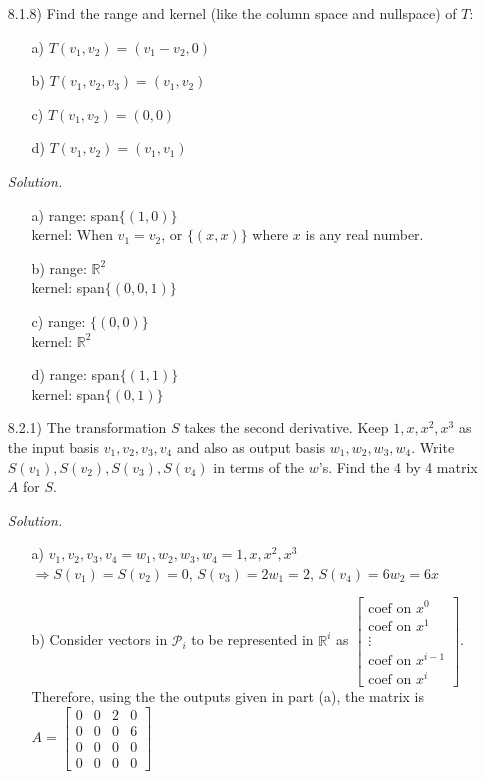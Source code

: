 \documentclass[12pt,pdftex]{article}
\begin{document}
\begin{itemize}
\item[8.1.8)] Find the range and kernel (like the column space and nullspace) of $T$:
\begin{itemize}
\item[a)] $T(v_1,v_2)=(v_1-v_2,0)$
\item[b)] $T(v_1,v_2,v_3)=(v_1,v_2)$
\item[c)] $T(v_1,v_2)=(0,0)$
\item[d)] $T(v_1,v_2)=(v_1,v_1)$
\end{itemize}

\textit{Solution.}
\begin{itemize}
\item[a)] range: span$\{(1, 0)\}$\\
			kernel: When $v_1=v_2$, or $\{(x,x)\}$ where $x$ is any real number.
\item[b)] range: $\mathbb{R}^2$\\
			kernel: span$\{(0,0,1)\}$
\item[c)] range: $\{(0,0)\}$\\
			kernel: $\mathbb{R}^2$
\item[d)] range: span$\{(1,1)\}$\\
			kernel: span$\{(0,1)\}$
\end{itemize}

\item[8.2.1)] The transformation $S$ takes the second derivative. Keep $1,x,x^2,x^3$ as the input basis 
				$v_1,v_2,v_3,v_4$ and also as output basis $w_1,w_2,w_3,w_4$. Write $S(v_1),S(v_2),S(v_3),S(v_4)$ in terms
                of the $w$'s. Find the 4 by 4 matrix $A$ for $S$.

\textit{Solution.}
\begin{itemize}
\item[a)] $v_1,v_2,v_3,v_4=w_1,w_2,w_3,w_4=1,x,x^2,x^3$\\
		$\Rightarrow S(v_1)=S(v_2)=0$, $S(v_3)=2w_1=2$, $S(v_4)=6w_2=6x$
\item[b)] Consider vectors in $\mathcal{P}_i$ to be represented in $\mathbb{R}^i$ as $\begin{bmatrix}
			\text{coef on } x^0 \\ \text{coef on } x^1 \\ \vdots \\ \text{coef on } x^{i - 1} \\ \text{coef on } x^i
			\end{bmatrix}$. Therefore, using the the outputs given in part (a), the matrix is $A=\begin{bmatrix}
			0 & 0 & 2 & 0 \\ 0 & 0 & 0 & 6 \\ 0 & 0 & 0 & 0 \\ 0 & 0 & 0 & 0
			\end{bmatrix}$
\end{itemize}


\end{itemize}
\end{document}
